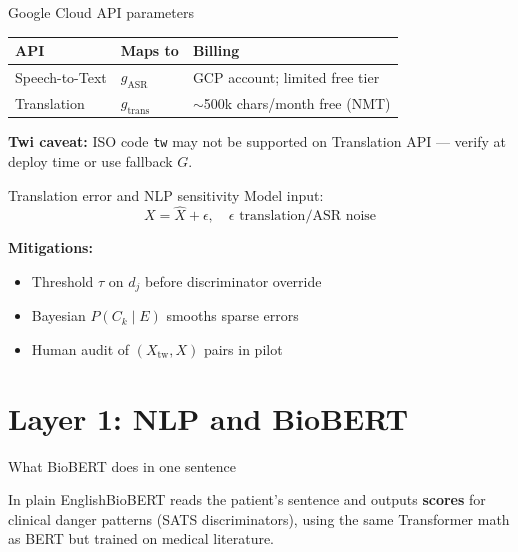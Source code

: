 \documentclass[aspectratio=169,11pt]{beamer}
\newcommand{\plain}[1]{\begin{block}{In plain English}\small #1\end{block}}
\begin{document}
\begin{frame}{Google Cloud API parameters}
	\small
	\begin{tabular}{@{}lll@{}}
		\toprule
		\textbf{API} & \textbf{Maps to} & \textbf{Billing} \\
		\midrule
		Speech-to-Text & $g_{\text{ASR}}$ & GCP account; limited free tier \\
		Translation & $g_{\text{trans}}$ & $\sim$500k chars/month free (NMT) \\
		\bottomrule
	\end{tabular}

	\vspace{0.3em}
	\textbf{Twi caveat:} ISO code \texttt{tw} may not be supported on Translation API --- verify at deploy time or use fallback $G$.
\end{frame}

\begin{frame}{Translation error and NLP sensitivity}
	Model input:
	\[
	X = \hat{X} + \epsilon, \quad \epsilon \text{ translation/ASR noise}
	\]

	\textbf{Mitigations:}
	\begin{itemize}
		\item Threshold $\tau$ on $d_j$ before discriminator override
		\item Bayesian $P(C_k\mid E)$ smooths sparse errors
		\item Human audit of $(X_{\text{tw}}, X)$ pairs in pilot
	\end{itemize}
\end{frame}

\section{Layer 1: NLP and BioBERT}

\begin{frame}{What BioBERT does in one sentence}
	\plain{BioBERT reads the patient's sentence and outputs \textbf{scores} for clinical danger patterns (SATS discriminators), using the same Transformer math as BERT but trained on medical literature.}

	\begin{center}
	\end{center}
\end{frame}
\end{document}
